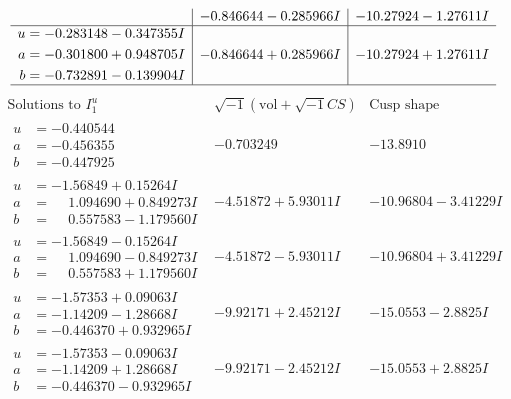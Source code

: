 \documentclass[1p]{elsarticle_modified}
\theoremstyle{definition}
\newcommand{\I}{\sqrt{-1}}
\begin{document}
$$\begin{array}{c|c|c}
 & -0.846644 - 0.285966 I & -10.27924 - 1.27611 I \\ \hline\begin{aligned}
u &= -0.283148 - 0.347355 I \\
a &= -0.301800 + 0.948705 I \\
b &= -0.732891 - 0.139904 I\end{aligned}
 & -0.846644 + 0.285966 I & -10.27924 + 1.27611 I\\
 \hline 
 \end{array}$$\newpage$$\begin{array}{c|c|c}  
\text{Solutions to }I^u_{1}& \I (\text{vol} + \sqrt{-1}CS) & \text{Cusp shape}\\
 \hline 
\begin{aligned}
u &= -0.440544\phantom{ +0.000000I} \\
a &= -0.456355\phantom{ +0.000000I} \\
b &= -0.447925\phantom{ +0.000000I}\end{aligned}
 & -0.703249\phantom{ +0.000000I} & -13.8910\phantom{ +0.000000I} \\ \hline\begin{aligned}
u &= -1.56849 + 0.15264 I \\
a &= \phantom{-}1.094690 + 0.849273 I \\
b &= \phantom{-}0.557583 - 1.179560 I\end{aligned}
 & -4.51872 + 5.93011 I & -10.96804 - 3.41229 I \\ \hline\begin{aligned}
u &= -1.56849 - 0.15264 I \\
a &= \phantom{-}1.094690 - 0.849273 I \\
b &= \phantom{-}0.557583 + 1.179560 I\end{aligned}
 & -4.51872 - 5.93011 I & -10.96804 + 3.41229 I \\ \hline\begin{aligned}
u &= -1.57353 + 0.09063 I \\
a &= -1.14209 - 1.28668 I \\
b &= -0.446370 + 0.932965 I\end{aligned}
 & -9.92171 + 2.45212 I & -15.0553 - 2.8825 I \\ \hline\begin{aligned}
u &= -1.57353 - 0.09063 I \\
a &= -1.14209 + 1.28668 I \\
b &= -0.446370 - 0.932965 I\end{aligned}
 & -9.92171 - 2.45212 I & -15.0553 + 2.8825 I \\ \hline\begin{aligned}

\end{aligned}
\end{array}$$
\end{document}
